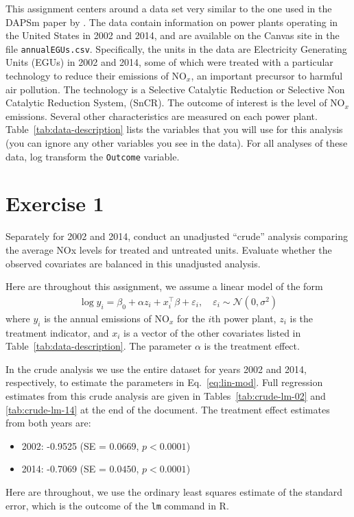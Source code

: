 \begin{quoting}
  This assignment centers around a data set very similar to the one
  used in the DAPSm paper by \cite{papadogeorgou2018adjusting}. The
  data contain information on power plants operating in the United
  States in 2002 and 2014, and are available on the Canvas site in the
  file \texttt{annualEGUs.csv}. Specifically, the units in the data
  are Electricity Generating Units (EGUs) in 2002 and 2014, some of
  which were treated with a particular technology to reduce their
  emissions of $\text{NO}_x$, an important precursor to harmful air
  pollution. The technology is a Selective Catalytic Reduction or
  Selective Non Catalytic Reduction System, (SnCR). The outcome of
  interest is the level of $\text{NO}_x$ emissions. Several other
  characteristics are measured on each power
  plant. Table~\ref{tab:data-description} lists the variables that you
  will use for this analysis (you can ignore any other variables you
  see in the data). For all analyses of these data, log transform the
  \texttt{Outcome} variable.
\end{quoting}

\section{Exercise 1}

\begin{quoting}
  Separately for 2002 and 2014, conduct an unadjusted ``crude'' analysis
  comparing the average NOx levels for treated and untreated
  units. Evaluate whether the observed covariates are balanced in this
  unadjusted analysis.
\end{quoting}

Here are throughout this assignment, we assume a linear model of the
form
\begin{align}
  \label{eq:lin-mod}
  \log y_i = \beta_0 + \alpha z_i + x_i^\intercal \beta + \varepsilon_i,
  \quad \varepsilon_i \sim \mathcal{N}(0, \sigma^2)
\end{align}
where $y_i$ is the annual emissions of NO$_x$ for the $i$th power
plant, $z_i$ is the treatment indicator, and $x_i$ is a vector of the
other covariates listed in Table~\ref{tab:data-description}.  The
parameter $\alpha$ is the treatment effect.

In the crude analysis we use the entire dataset for years 2002 and
2014, respectively, to estimate the parameters in
Eq.~\eqref{eq:lin-mod}.  Full regression estimates from this crude
analysis are given in Tables~\ref{tab:crude-lm-02} and
\ref{tab:crude-lm-14} at the end of the document.  The treatment
effect estimates from both years are:
\begin{itemize}
\item 2002: -0.9525 (SE = $0.0669$, $p < 0.0001$)
\item 2014: -0.7069 (SE = $0.0450$, $p < 0.0001$)
\end{itemize}
Here are throughout, we use the ordinary least squares estimate of the
standard error, which is the outcome of the \texttt{lm} command in R.

